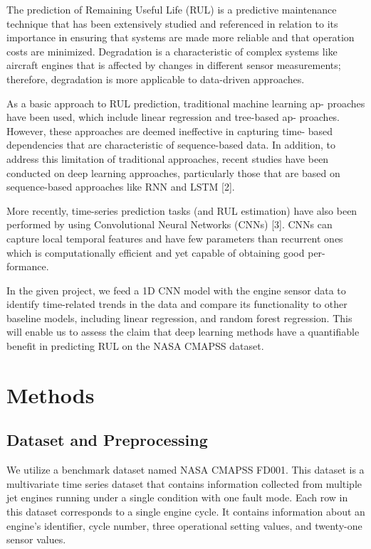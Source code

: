 \documentclass[11pt]{article}
\begin{document}
The prediction of Remaining Useful Life (RUL) is a predictive maintenance
technique that has been extensively studied and referenced in relation to its
importance in ensuring that systems are made more reliable and that operation
costs are minimized. Degradation is a characteristic of complex systems like
aircraft engines that is affected by changes in different sensor measurements;
therefore, degradation is more applicable to data-driven approaches.

As a basic approach to RUL prediction, traditional machine learning ap-
proaches have been used, which include linear regression and tree-based ap-
proaches. However, these approaches are deemed ineffective in capturing time-
based dependencies that are characteristic of sequence-based data. In addition,
to address this limitation of traditional approaches, recent studies have been
conducted on deep learning approaches, particularly those that are based on
sequence-based approaches like RNN and LSTM [2].

More recently, time-series prediction tasks (and RUL estimation) have also
been performed by using Convolutional Neural Networks (CNNs) [3]. CNNs
can capture local temporal features and have few parameters than recurrent
ones which is computationally efficient and yet capable of obtaining good per-
formance.

In the given project, we feed a 1D CNN model with the engine sensor data to
identify time-related trends in the data and compare its functionality to other
baseline models, including linear regression, and random forest regression. This
will enable us to assess the claim that deep learning methods have a quantifiable
benefit in predicting RUL on the NASA CMAPSS dataset.

\section{Methods}

\subsection{Dataset and Preprocessing}

We utilize a benchmark dataset named NASA CMAPSS FD001. This dataset
is a multivariate time series dataset that contains information collected from
multiple jet engines running under a single condition with one fault mode. Each
row in this dataset corresponds to a single engine cycle. It contains information
about an engine's identifier, cycle number, three operational setting values, and
twenty-one sensor values.
\end{document}
